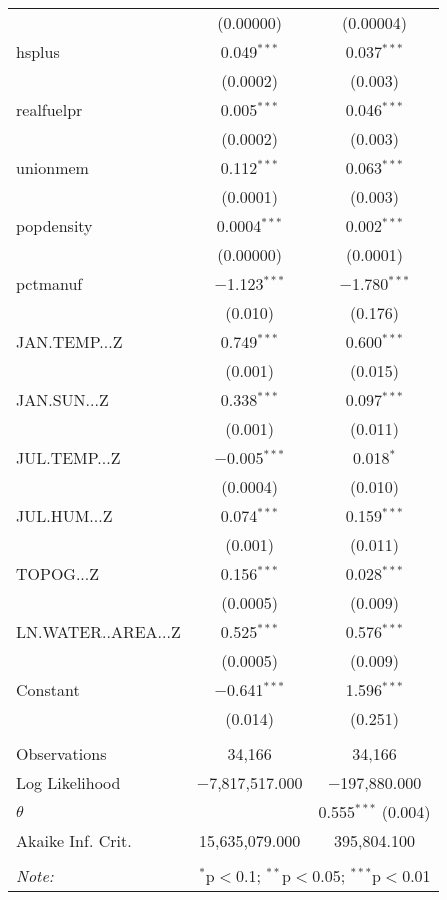 \begin{table}[!htbp]
\begin{tabular}{@{\extracolsep{5pt}}lcc}
  & (0.00000) & (0.00004) \\ 
  hsplus & 0.049$^{***}$ & 0.037$^{***}$ \\ 
  & (0.0002) & (0.003) \\ 
  realfuelpr & 0.005$^{***}$ & 0.046$^{***}$ \\ 
  & (0.0002) & (0.003) \\ 
  unionmem & 0.112$^{***}$ & 0.063$^{***}$ \\ 
  & (0.0001) & (0.003) \\ 
  popdensity & 0.0004$^{***}$ & 0.002$^{***}$ \\ 
  & (0.00000) & (0.0001) \\ 
  pctmanuf & $-$1.123$^{***}$ & $-$1.780$^{***}$ \\ 
  & (0.010) & (0.176) \\ 
  JAN.TEMP...Z & 0.749$^{***}$ & 0.600$^{***}$ \\ 
  & (0.001) & (0.015) \\ 
  JAN.SUN...Z & 0.338$^{***}$ & 0.097$^{***}$ \\ 
  & (0.001) & (0.011) \\ 
  JUL.TEMP...Z & $-$0.005$^{***}$ & 0.018$^{*}$ \\ 
  & (0.0004) & (0.010) \\ 
  JUL.HUM...Z & 0.074$^{***}$ & 0.159$^{***}$ \\ 
  & (0.001) & (0.011) \\ 
  TOPOG...Z & 0.156$^{***}$ & 0.028$^{***}$ \\ 
  & (0.0005) & (0.009) \\ 
  LN.WATER..AREA...Z & 0.525$^{***}$ & 0.576$^{***}$ \\ 
  & (0.0005) & (0.009) \\ 
  Constant & $-$0.641$^{***}$ & 1.596$^{***}$ \\ 
  & (0.014) & (0.251) \\ 
 \hline \\[-1.8ex] 
Observations & 34,166 & 34,166 \\ 
Log Likelihood & $-$7,817,517.000 & $-$197,880.000 \\ 
$\theta$ &  & 0.555$^{***}$  (0.004) \\ 
Akaike Inf. Crit. & 15,635,079.000 & 395,804.100 \\ 
\hline 
\hline \\[-1.8ex] 
\textit{Note:}  & \multicolumn{2}{r}{$^{*}$p$<$0.1; $^{**}$p$<$0.05; $^{***}$p$<$0.01} \\ 
\end{tabular} 
\end{table} 
